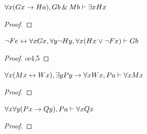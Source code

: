 \begin{earg}

\noindent\begin{minipage}{0.99\textwidth}
\item $\forall x(Gx \rightarrow Ha), Gb \mathbin{\&} Mb \vdash \exists xHx$

\begin{proof}
	 \pr{}
	 \pr{}
	 
	 
	 
	 
\end{proof}
\end{minipage}
\bigskip


\noindent\begin{minipage}{0.99\textwidth}
\item${\neg} Fe \leftrightarrow \forall xGx, \forall y{\neg} Hy, \forall x(Hx \vee {\neg} Fx) \vdash Gb$
\begin{proof}
	 \pr{}
	 \pr{}
	 \pr{}
	 
	 
	 \oe{4,5}
	 
	 
\end{proof}
\end{minipage}



\noindent\begin{minipage}{0.99\textwidth}
\item $\forall x(Mx \leftrightarrow Wx), \exists yPy \rightarrow \forall xWx, Pa \vdash \forall xMx$

\begin{proof}
	 \pr{}
	 \pr{}
	 \pr{}
	 
	 
	 
	 
	 
	 
\end{proof}
\bigskip
\end{minipage}


\noindent\begin{minipage}{0.99\textwidth}
\item $\forall x \forall y(Px \rightarrow Qy), Pa \vdash \forall xQx$

\begin{proof}
	 \pr{}
	 \pr{}
	 
	 
	 
	 
\end{proof}
\end{minipage}
\bigskip



\end{earg}
